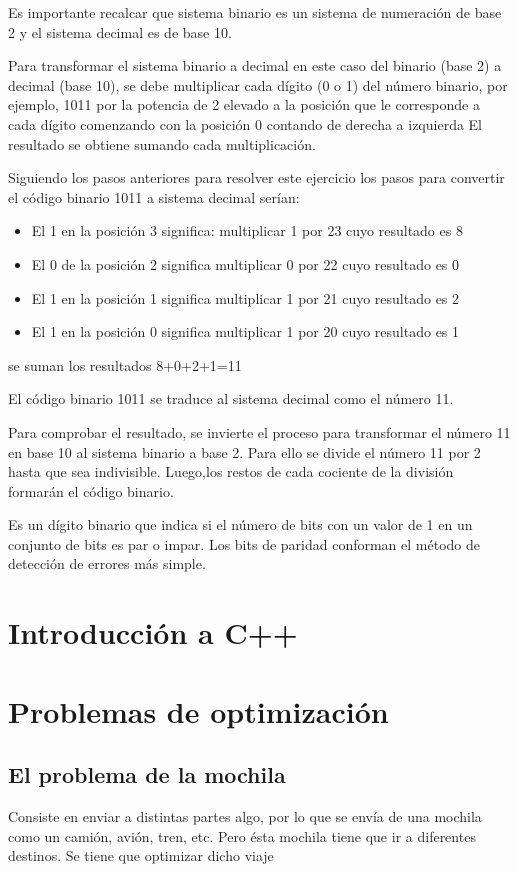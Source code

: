 Es importante recalcar que sistema binario es un sistema de numeración de base 2 y el sistema decimal es de base 10.

Para transformar el sistema binario a decimal en este caso del binario (base 2) a decimal (base 10), se debe multiplicar cada dígito (0 o 1) del número binario, por ejemplo, 1011 por la potencia de 2 elevado a la posición que le corresponde a cada dígito comenzando con la posición 0 contando de derecha a izquierda El resultado se obtiene sumando cada multiplicación.

Siguiendo los pasos anteriores para resolver este ejercicio los pasos para convertir el código binario 1011 a sistema decimal serían:

\begin{itemize}
    \item El 1 en la posición 3 significa: multiplicar 1 por 23 cuyo resultado es 8
    \item El 0 de la posición 2 significa multiplicar 0 por 22 cuyo resultado es 0
    \item El 1 en la posición 1 significa multiplicar 1 por 21 cuyo resultado es 2
    \item El 1 en la posición 0 significa multiplicar 1 por 20 cuyo resultado es 1
\end{itemize}

se suman los resultados 8+0+2+1=11

El código binario 1011 se traduce al sistema decimal como el número 11.

Para comprobar el resultado, se invierte el proceso para transformar el número 11 en base 10 al sistema binario a base 2. Para ello se divide el número 11 por 2 hasta que sea indivisible. Luego,los restos de cada cociente de la división formarán el código binario.


\begin{definition}
    Es un dígito binario que indica si el número de bits con un valor de 1 en un conjunto de bits es par o impar. Los bits de paridad conforman el método de detección de errores más simple.
\end{definition}

\section{Introducción a C++}

\section{Problemas de optimización}

\subsection{El problema de la mochila}

Consiste en enviar a distintas partes algo, por lo que se envía de una mochila como un camión, avión, tren, etc.
Pero ésta mochila tiene que ir a diferentes destinos. Se tiene que optimizar dicho viaje

